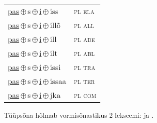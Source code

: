 \begin{minipage}{\textwidth}
\begin{sideways}
\begin{tabular}{l l}
\underline{pas}\,$\oplus$\,s\,$\oplus$\,\underline{i}\,$\oplus$\,iss & \textsc{ pl ela } \\
\underline{pas}\,$\oplus$\,s\,$\oplus$\,\underline{i}\,$\oplus$\,illõ & \textsc{ pl all } \\
\underline{pas}\,$\oplus$\,s\,$\oplus$\,\underline{i}\,$\oplus$\,ill & \textsc{ pl ade } \\
\underline{pas}\,$\oplus$\,s\,$\oplus$\,\underline{i}\,$\oplus$\,ilt & \textsc{ pl abl } \\
\underline{pas}\,$\oplus$\,s\,$\oplus$\,\underline{i}\,$\oplus$\,issi & \textsc{ pl tra } \\
\underline{pas}\,$\oplus$\,s\,$\oplus$\,\underline{i}\,$\oplus$\,issaa & \textsc{ pl ter } \\
\underline{pas}\,$\oplus$\,s\,$\oplus$\,\underline{i}\,$\oplus$\,jka & \textsc{ pl com } \\
\end{tabular}
\end{sideways}
\label{tab:tüüpsõnamall-passi}

\end{minipage}

 
\vspace{1em}
\noindent Tüüpsõna hõlmab vormisõnastikus 2 lekseemi:  ja .
